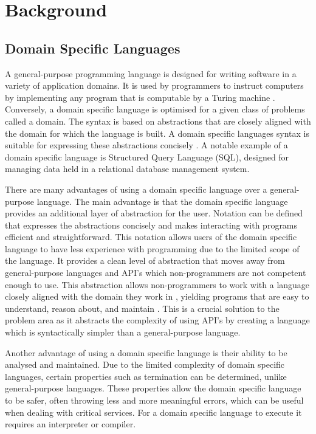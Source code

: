 \chapter{Background}

\section{Domain Specific Languages}

A general-purpose programming language is designed for writing software in a variety of application domains. It is used by programmers to instruct computers by implementing any program that is computable by a Turing machine \cite{DslEngineering2013}. Conversely, a domain specific language is optimised for a given class of problems called a domain.  The syntax is based on abstractions that are closely aligned with the domain for which the language is built. A domain specific languages syntax is suitable for expressing these abstractions concisely \cite{DslEngineering2013}. A notable example of a domain specific language is Structured Query Language (SQL), designed for managing data held in a relational database management system. \newline \par

There are many advantages of using a domain specific language over a general-purpose language. The main advantage is that the domain specific language provides an additional layer of abstraction for the user. Notation can be defined that expresses the abstractions concisely and makes interacting with programs efficient and straightforward. This notation allows users of the domain specific language to have less experience with programming due to the limited scope of the language. It provides a clean level of abstraction that moves away from general-purpose languages and API’s which non-programmers are not competent enough to use. This abstraction allows non-programmers to work with a language closely aligned with the domain they work in \cite{DslEngineering2013},  yielding programs that are easy to understand, reason about, and maintain \cite{685738}. This is a crucial solution to the problem area as it abstracts the complexity of using API’s by creating a language which is syntactically simpler than a general-purpose language. \newline \par

Another advantage of using a domain specific language is their ability to be analysed and maintained. Due to the limited complexity of domain specific languages, certain properties such as termination can be determined, unlike general-purpose languages. These properties allow the domain specific language to be safer, often throwing less and more meaningful errors, which can be useful when dealing with critical services. For a domain specific language to execute it requires an interpreter or compiler.

